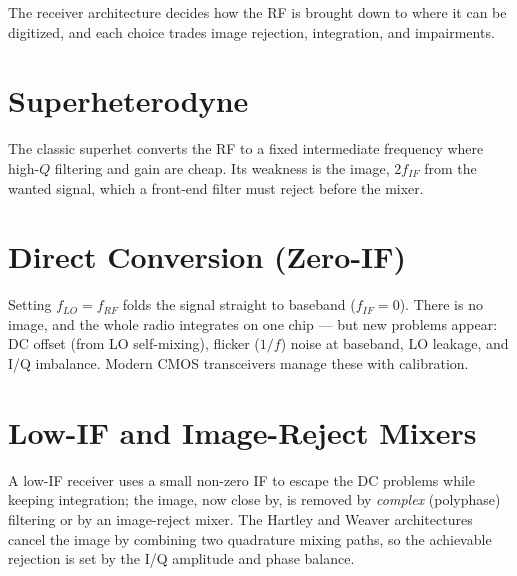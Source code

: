 The receiver architecture decides how the RF is brought down to where it can be
digitized, and each choice trades image rejection, integration, and impairments.

\section{Superheterodyne}
The classic superhet converts the RF to a fixed intermediate frequency where
high-$Q$ filtering and gain are cheap. Its weakness is the image, $2f_{IF}$ from
the wanted signal, which a front-end filter must reject before the mixer.

\section{Direct Conversion (Zero-IF)}
Setting $f_{LO}=f_{RF}$ folds the signal straight to baseband ($f_{IF}=0$). There
is no image, and the whole radio integrates on one chip --- but new problems
appear: DC offset (from LO self-mixing), flicker ($1/f$) noise at baseband, LO
leakage, and I/Q imbalance. Modern CMOS transceivers manage these with
calibration.

\section{Low-IF and Image-Reject Mixers}
A low-IF receiver uses a small non-zero IF to escape the DC problems while
keeping integration; the image, now close by, is removed by \emph{complex}
(polyphase) filtering or by an image-reject mixer. The Hartley and Weaver
architectures cancel the image by combining two quadrature mixing paths, so the
achievable rejection is set by the I/Q amplitude and phase balance.
